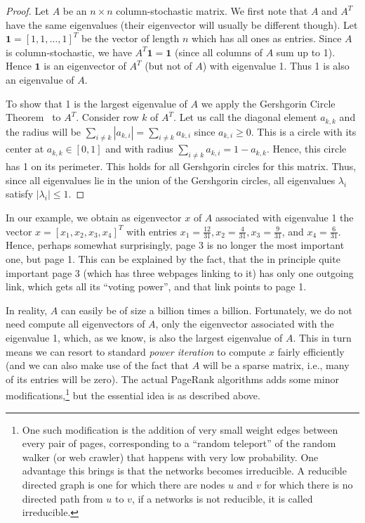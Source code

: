 \begin{proof}
Let $A$ be an $n\times n$ column-stochastic matrix.
We first note that $A$ and $A^T$ have the same eigenvalues (their eigenvector will usually be different though).
Let $\mathbf{1} = [1,1,\dots,1]^T$ be the vector of length $n$ which has all ones as entries. Since $A$ is
column-stochastic, we have $A^T \mathbf{1} = \mathbf{1}$ (since all columns of $A$ sum up to 1). Hence $\mathbf{1}$ is an eigenvector of
$A^T$ (but not of $A$) with eigenvalue 1. Thus 1 is also an eigenvalue of $A$.

To show that 1 is the largest eigenvalue of $A$ we apply the Gershgorin Circle Theorem~\cite{HJ90} to $A^T$. Consider
row $k$ of $A^T$. Let us call the diagonal element $a_{k,k}$ and the radius will be
$\sum_{i \neq k} |a_{k,i}| = \sum_{i \neq k} a_{k,i}$ since $a_{k,i} \ge 0$. This is a circle with its center
at $a_{k,k} \in [0,1]$ and with radius $\sum_{i \neq k} a_{k,i} = 1 - a_{k,k}$. Hence, this circle has 1 on its
perimeter. This holds for all Gershgorin circles for this matrix.  Thus, since all eigenvalues lie in the
union of the Gershgorin circles, all eigenvalues $\lambda_i$ satisfy $|\lambda_i| \le 1$.

\end{proof}


In our example, we obtain as eigenvector $x$ of $A$ associated with eigenvalue 1 the vector
$x = [x_1,x_2,x_3,x_4]^T$ with entries
 $x_1 = \frac{12}{31}, x_2 = \frac{4}{31}, x_3 = \frac{9}{31}$, and $x_4 =
\frac{6}{31}$. Hence, perhaps somewhat surprisingly, page 3 is no longer the most important one, but page 1.
This can be explained by the fact, that the in principle quite important page 3 (which has three webpages linking to
it) has only one outgoing link, which gets all its ``voting power'', and that link points to page 1.


In reality, $A$ can easily be of size a billion times a billion. Fortunately, we do not need compute all eigenvectors
of $A$, only the eigenvector associated with the eigenvalue 1, which, as we know, is also the largest eigenvalue of $A$.
This in turn means we can resort to standard {\em power iteration} to compute $x$ fairly efficiently (and we can also make
use of the fact that $A$ will be a sparse matrix, i.e., many of its entries will be zero).
The actual PageRank algorithms adds some minor modifications,\footnote{One such modification is the addition of very small weight edges between every pair of pages, corresponding to a ``random teleport'' of the random walker (or web crawler) that happens with very low probability. One advantage this brings is that the networks becomes irreducible. A reducible directed graph is one for which there are nodes $u$ and $v$ for which there is no directed path from $u$ to $v$, if a networks is not reducible, it is called irreducible.} but the essential idea is as described above.


